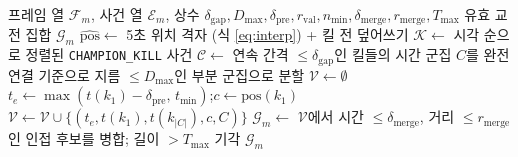 \begin{algorithm}[htbp]
\caption{킬 조건부 교전 국소화 (\texttt{teamfight\_v2})}
\label{alg:localization}
\begin{algorithmic}[1]
\Require 프레임 열 $\mathcal{F}_m$, 사건 열 $\mathcal{E}_m$, 상수 $\delta_{\mathrm{gap}}, D_{\max}, \delta_{\mathrm{pre}}, r_{\mathrm{val}}, n_{\min}, \delta_{\mathrm{merge}}, r_{\mathrm{merge}}, T_{\max}$
\Ensure 유효 교전 집합 $\mathcal{G}_m$
\State $\widehat{\mathrm{pos}} \gets$ 5초 위치 격자 (식 \eqref{eq:interp}) + 킬 전 덮어쓰기 
\State $\mathcal{K} \gets$ 시각 순으로 정렬된 \texttt{CHAMPION\_KILL} 사건
\State $\mathcal{C} \gets$ 연속 간격 $\le \delta_{\mathrm{gap}}$인 킬들의 시간 군집 
  \State $C$를 완전 연결 기준으로 지름 $\le D_{\max}$인 부분 군집으로 분할 
\EndFor
\State $\mathcal{V} \gets \emptyset$
  \State $t_e \gets \max(t(k_1) - \delta_{\mathrm{pre}},\, t_{\min})$;\quad $c \gets \mathrm{pos}(k_1)$
    \State $\mathcal{V} \gets \mathcal{V} \cup \{(t_e, t(k_1), t(k_{|C|}), c, C)\}$
  \EndIf
\EndFor
\State $\mathcal{G}_m \gets$ $\mathcal{V}$에서 시간 $\le \delta_{\mathrm{merge}}$, 거리 $\le r_{\mathrm{merge}}$인 인접 후보를 병합; 길이 $> T_{\max}$ 기각
\State \Return $\mathcal{G}_m$
\end{algorithmic}
\end{algorithm}
